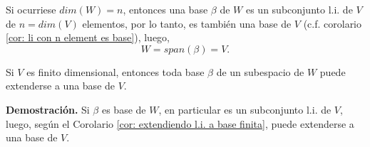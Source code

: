 Si ocurriese $dim(W) = n$, entonces una base $\beta$ de $W$
es un subconjunto l.i. de $V$ de $n = dim(V)$ elementos,
por lo tanto, es también una base de $V$
(c.f. corolario \ref{cor: li con n element es base}),
luego,
\[
W = span(\beta) = V.
\]
\QEDB
\vspace{0.2cm}

\begin{cor}
Si $V$ es finito dimensional, entonces toda base
$\beta$ de un subespacio de $W$ puede extenderse a una base de $V$.
\end{cor}
\noindent
\textbf{Demostración.}
Si $\beta$ es base de $W$, en particular es un subconjunto
l.i. de $V$, luego, según el Corolario 
\ref{cor: extendiendo l.i. a base finita}, puede extenderse a una
base de $V$.
\QEDB
\vspace{0.2cm}

